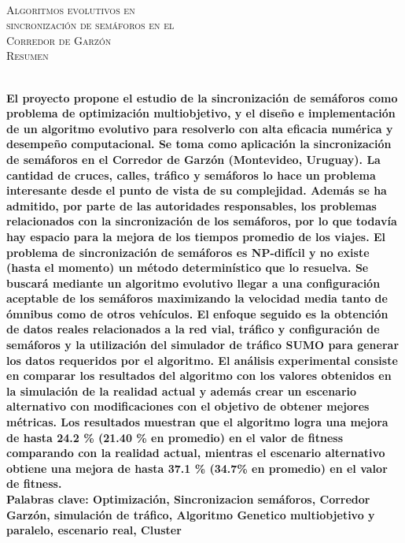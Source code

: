 {
\thispagestyle{empty}
~\\[0.2cm]
\begin{center}
    \textsc{\huge Algoritmos evolutivos en  } \\[0.2cm] 
    \textsc{\huge sincronización de semáforos en el  } \\[0.2cm]         
    \textsc{\huge Corredor de Garzón} \\[1cm]
    \textsc{\Large Resumen}
\end{center}
~\\[0.2cm]
\textbf{\large 
El proyecto propone el estudio de la sincronización de semáforos como problema de optimización multiobjetivo, y el diseño e implementación de un algoritmo evolutivo para resolverlo con alta eficacia numérica y desempeño computacional. \newline \newline
Se toma como aplicación la sincronización de semáforos en el Corredor de Garzón  (Montevideo, Uruguay). La cantidad de cruces, calles, tráfico y semáforos lo hace un problema interesante desde el punto de vista de su complejidad. Además se ha admitido, por parte de las autoridades responsables, los problemas relacionados con la sincronización de los semáforos, por lo que todavía hay espacio para la mejora de los tiempos promedio de los viajes.  \newline \newline
El problema de sincronización de semáforos es NP-difícil y no existe (hasta el momento) un método determinístico que lo resuelva. Se buscará mediante un algoritmo evolutivo llegar a una configuración aceptable de los semáforos maximizando la velocidad media tanto de ómnibus como de otros vehículos.
El enfoque seguido es la obtención de datos reales relacionados a la red vial, tráfico y configuración de semáforos y la utilización del simulador de tráfico SUMO para generar los datos requeridos por el algoritmo.
\newline \newline
El análisis experimental consiste en comparar los resultados del algoritmo con los valores obtenidos en la simulación de la realidad actual y además crear un escenario alternativo con modificaciones con el objetivo de obtener mejores métricas. Los resultados muestran que el algoritmo logra una mejora de hasta  24.2 \% (21.40 \% en promedio) en el valor de fitness comparando con la realidad actual, mientras el escenario alternativo obtiene una mejora de hasta 37.1 \% (34.7\% en promedio) en el valor de fitness.
 } 	
	~\\[1.0cm]
    \textbf{\large Palabras clave: Optimización, Sincronizacion semáforos, Corredor Garzón, simulación de tráfico,  Algoritmo Genetico multiobjetivo y paralelo,  escenario real, Cluster}

}
\cleardoublepage
